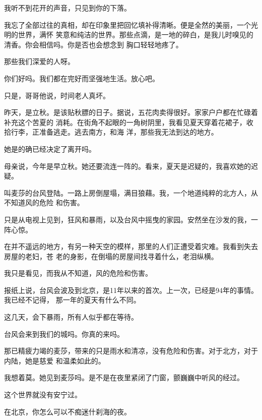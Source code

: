 		\vspace{1em}
		我听不到花开的声音，只见到你的下落。

		我忘了全部过往的真相，却在印象里把回忆填补得清晰。便是全然的美丽，一个光明的世界，满怀
	笑意和纯洁的世界。那些点滴，是一地的碎白，是我儿时嗅见的清香。你会相信吗。你是否也会想念到
	胸口轻轻地疼了。

		\vspace{1em}
		那些我们深爱的人呀。\par
		你们好吗。我们都在完好而坚强地生活。放心吧。

		只是，哥哥他说，时间老人真坏。

	\endwriting



		昨天，是立秋。是该贴秋膘的日子。据说，五花肉卖得很好。家家户户都在忙碌着补充这个苦夏的
	消耗。在街角不起眼的一角树阴里，我看见夏天穿着花裙子，收拾行李，正准备逃走。逃去南方，和海
	洋，那些我无法到达的地方。

		她是的确已经决定了离开吗。

		母亲说，今年是早立秋。她还要流连一阵的。看来，夏天是迟疑的，我喜欢她的迟疑。


		叫麦莎的台风登陆。一路上房倒屋塌，满目狼藉。我，一个地道纯粹的北方人，从不知道风的危险
	和伤害。

		只是从电视上见到，狂风和暴雨，以及台风中摇曳的家园。安然坐在沙发的我，一阵心惊。

		在并不遥远的地方，有另一种天空的模样，那里的人们正遭受着灾难。我看到失去房屋的老妇，苍
	老的身影，在倒塌的房屋间找寻着什么，老泪纵横。

		我只是看见，而我从不知道，风的危险和伤害。

		报纸上说，台风会波及到北京，是11年以来的首次。上一次，已经是94年的事情。我已经不记得，
	那一年的夏天有什么不同。

		这几天，会下暴雨，所有人似乎都在等待。

		台风会来到我们的城吗。你真的来吗。

		那已精疲力竭的麦莎，带来的只是雨水和清凉，没有危险和伤害。对于北方，对于内陆，她是慈爱
	和温柔如此的。

		我想着莫。她见到麦莎吗。是不是在夜里紧闭了门窗，颤巍巍中听风的经过。


		这个世界就没有安宁过。

	\endwriting



		在北京，你怎么可以不痴迷什刹海的夜。

